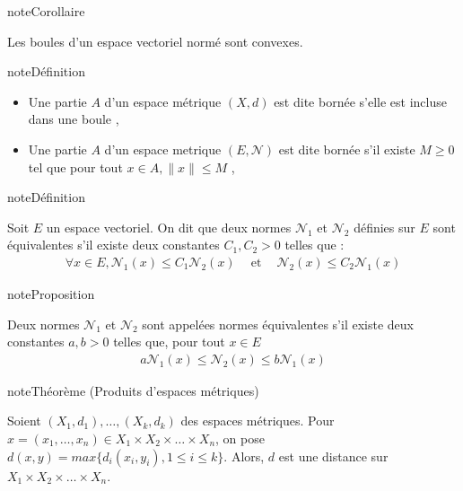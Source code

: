 \documentclass[letterpaper,10pt,french]{sphinxmanual}
\begin{document}
\begin{sphinxadmonition}{note}{Corollaire}

\sphinxAtStartPar
Les boules d’un espace vectoriel normé sont convexes.
\end{sphinxadmonition}

\begin{sphinxadmonition}{note}{Définition}
\begin{itemize}
\item {} 
\sphinxAtStartPar
Une partie \(A\) d’un espace métrique \((X, d)\) est dite bornée s’elle est incluse dans une boule ,

\item {} 
\sphinxAtStartPar
Une partie \(A\) d’un espace metrique \((E, \mathcal N)\) est dite bornée s’il existe \(M\geq 0\) tel que pour tout \(x\in A, \|x\|\leq M\) ,

\end{itemize}
\end{sphinxadmonition}

\begin{sphinxadmonition}{note}{Définition}

\sphinxAtStartPar
Soit \(E\) un espace vectoriel. On dit que deux normes \(\mathcal N_1\) et \(\mathcal N_2\) définies sur \(E\) sont équivalentes s’il existe deux constantes \(C_1, C_2 >0\) telles que :
\begin{equation*}
\begin{split}
\forall x \in E, \mathcal N_1(x) \leq C_1\mathcal N_2(x) ~~~~ \mbox{ et } ~~~~ \mathcal N_2(x) \leq C_2\mathcal N_1(x)
\end{split}
\end{equation*}\end{sphinxadmonition}

\begin{sphinxadmonition}{note}{Proposition}

\sphinxAtStartPar
Deux normes \(\mathcal N_1\) et \(\mathcal N_2\) sont appelées normes équivalentes s’il existe deux constantes \(a, b>0\) telles que, pour tout
\(x \in E\)
\begin{equation*}
\begin{split}
a\mathcal N_1(x) \leq \mathcal N_2(x) \leq b\mathcal N_1 (x)
\end{split}
\end{equation*}\end{sphinxadmonition}

\begin{sphinxadmonition}{note}{Théorème (Produits d’espaces métriques)}

\sphinxAtStartPar
Soient \((X_1, d_1),\ldots, (X_k,d_k)\) des espaces métriques.
Pour \(x = (x_1,\ldots, x_n) \in X_1\times X_2 \times \ldots \times X_n\), on pose \(d(x,y) = max \{d_i(x_i,y_i), 1 \leq i \leq k\}\). Alors, \(d\) est une distance sur \(X_1\times X_2 \times \ldots \times X_n\).
\end{sphinxadmonition}
\end{document}
